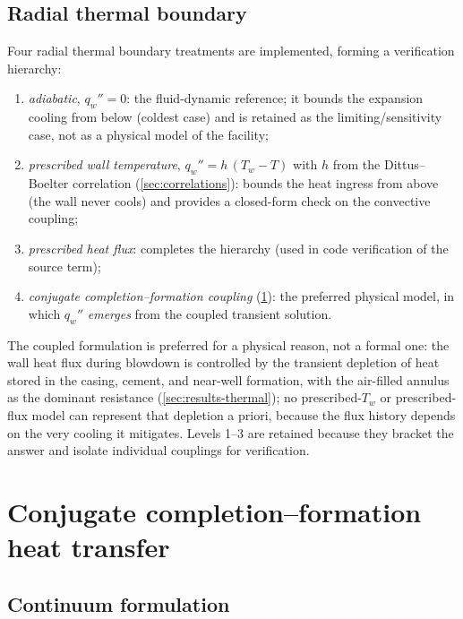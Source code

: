 \documentclass[11pt]{article}
\begin{document}
\subsection{Radial thermal boundary}
\label{sec:bc-thermal}

Four radial thermal boundary treatments are implemented, forming a
verification hierarchy:
\begin{enumerate}
\item \emph{adiabatic}, $q_w'' = 0$: the fluid-dynamic reference; it
bounds the expansion cooling from below (coldest case) and is retained
as the limiting/sensitivity case, not as a physical model of the
facility;
\item \emph{prescribed wall temperature}, $q_w'' = h\,(T_w - T)$ with
$h$ from the Dittus--Boelter correlation (\cref{sec:correlations}):
bounds the heat ingress from above (the wall never cools) and provides
a closed-form check on the convective coupling;
\item \emph{prescribed heat flux}: completes the hierarchy (used in
code verification of the source term);
\item \emph{conjugate completion--formation coupling}
(\cref{sec:thermal}): the preferred physical model, in which
$q_w''$ \emph{emerges} from the coupled transient solution.
\end{enumerate}
The coupled formulation is preferred for a physical reason, not a
formal one: the wall heat flux during blowdown is controlled by the
transient depletion of heat stored in the casing, cement, and
near-well formation, with the air-filled annulus as the dominant
resistance (\cref{sec:results-thermal}); no prescribed-$T_w$ or
prescribed-flux model can represent that depletion a priori, because
the flux history depends on the very cooling it mitigates. Levels 1--3
are retained because they bracket the answer and isolate individual
couplings for verification.

\section{Conjugate completion--formation heat transfer}
\label{sec:thermal}

\subsection{Continuum formulation}
\label{sec:thermal-continuum}
\end{document}
